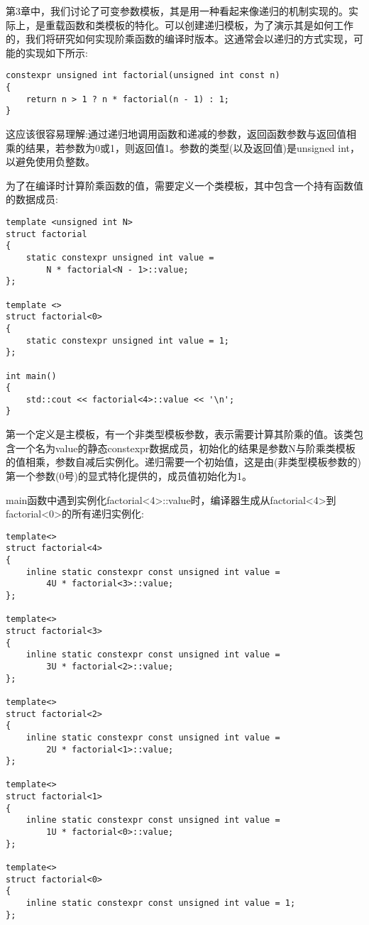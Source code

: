 第3章中，我们讨论了可变参数模板，其是用一种看起来像递归的机制实现的。实际上，是重载函数和类模板的特化。可以创建递归模板，为了演示其是如何工作的，我们将研究如何实现阶乘函数的编译时版本。这通常会以递归的方式实现，可能的实现如下所示:

\begin{lstlisting}[style=styleCXX]
constexpr unsigned int factorial(unsigned int const n)
{
	return n > 1 ? n * factorial(n - 1) : 1;
}
\end{lstlisting}

这应该很容易理解:通过递归地调用函数和递减的参数，返回函数参数与返回值相乘的结果，若参数为0或1，则返回值1。参数的类型(以及返回值)是unsigned int，以避免使用负整数。

为了在编译时计算阶乘函数的值，需要定义一个类模板，其中包含一个持有函数值的数据成员:

\begin{lstlisting}[style=styleCXX]
template <unsigned int N>
struct factorial
{
	static constexpr unsigned int value =
		N * factorial<N - 1>::value;
};

template <>
struct factorial<0>
{
	static constexpr unsigned int value = 1;
};

int main()
{
	std::cout << factorial<4>::value << '\n';
}
\end{lstlisting}

第一个定义是主模板，有一个非类型模板参数，表示需要计算其阶乘的值。该类包含一个名为value的静态constexpr数据成员，初始化的结果是参数N与阶乘类模板的值相乘，参数自减后实例化。递归需要一个初始值，这是由(非类型模板参数的)第一个参数(0号)的显式特化提供的，成员值初始化为1。

main函数中遇到实例化factorial<4>::value时，编译器生成从factorial<4>到factorial<0>的所有递归实例化:

\begin{lstlisting}[style=styleCXX]
template<>
struct factorial<4>
{
	inline static constexpr const unsigned int value =
		4U * factorial<3>::value;
};

template<>
struct factorial<3>
{
	inline static constexpr const unsigned int value =
		3U * factorial<2>::value;
};

template<>
struct factorial<2>
{
	inline static constexpr const unsigned int value =
		2U * factorial<1>::value;
};

template<>
struct factorial<1>
{
	inline static constexpr const unsigned int value =
		1U * factorial<0>::value;
};

template<>
struct factorial<0>
{
	inline static constexpr const unsigned int value = 1;
};
\end{lstlisting}

